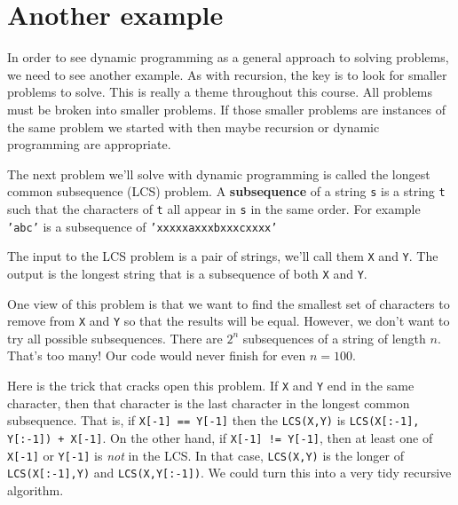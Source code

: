 \section{Another example}


In order to see dynamic programming as a general approach to solving problems, we need to see another example.
As with recursion, the key is to look for smaller problems to solve.
This is really a theme throughout this course.
All problems must be broken into smaller problems.
If those smaller problems are instances of the same problem we started with then maybe recursion or dynamic programming are appropriate.


The next problem we'll solve with dynamic programming is called the longest common subsequence (LCS) problem.
A \textbf{subsequence} of a string \texttt{s} is a string \texttt{t} such that the characters of \texttt{t} all appear in \texttt{s} in the same order.
For example \texttt{'abc'} is a subsequence of \texttt{'xxxxxaxxxbxxxcxxxx'}


The input to the LCS problem is a pair of strings, we'll call them \texttt{X} and \texttt{Y}.
The output is the longest string that is a subsequence of both \texttt{X} and \texttt{Y}.


One view of this problem is that we want to find the smallest set of characters to remove from \texttt{X} and \texttt{Y} so that the results will be equal.
However, we don't want to try all possible subsequences.
There are $2^n$ subsequences of a string of length $n$.
That's too many!
Our code would never finish for even $n = 100$.


Here is the trick that cracks open this problem.
If \texttt{X} and \texttt{Y} end in the same character, then that character is the last character in the longest common subsequence.
That is, if \texttt{X[-1] == Y[-1]} then the \texttt{LCS(X,Y)} is \texttt{LCS(X[:-1], Y[:-1]) + X[-1]}.
On the other hand, if \texttt{X[-1] != Y[-1]}, then at least one of \texttt{X[-1]} or \texttt{Y[-1]} is \emph{not} in the LCS.
In that case, \texttt{LCS(X,Y)} is the longer of \texttt{LCS(X[:-1],Y)} and \texttt{LCS(X,Y[:-1])}.
We could turn this into a very tidy recursive algorithm.


